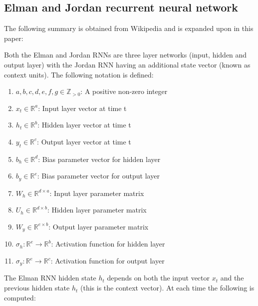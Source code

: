 \documentclass[conference]{IEEEtran}
\begin{document}
\subsection{Elman and Jordan recurrent neural network}

The following summary is obtained from Wikipedia\cite{enwiki:1314348414} and is expanded upon in this paper:

Both the Elman and Jordan RNNs are three layer networks (input, hidden and output layer) with the Jordan RNN having an additional state vector (known as context units). The following notation is defined:

\begin{enumerate}
	\item $a,b,c,d,e,f,g \in \mathbb{Z}_{>0}$: A positive non-zero integer
	
	\item $x_t \in \mathbb{R}^a$: Input layer vector at time t
	\item $h_t \in \mathbb{R}^b$: Hidden layer vector at time t
	\item $y_t \in \mathbb{R}^c$: Output layer vector at time t
	
	\item $b_h \in \mathbb{R}^{d}$: Bias parameter vector for hidden layer
	\item $b_y \in \mathbb{R}^{e}$: Bias parameter vector for output layer
	
	\item $W_h \in \mathbb{R}^{d \times a}$: Input layer parameter matrix
	\item $U_h \in \mathbb{R}^{d \times b}$: Hidden layer parameter matrix
	
	\item $W_y \in \mathbb{R}^{e \times b}$: Output layer parameter matrix
	
	
	\item $\sigma_h: \mathbb{R}^e \to \mathbb{R}^b $: Activation function for hidden layer
	\item $\sigma_y: \mathbb{R}^e \to \mathbb{R}^c $: Activation function for output layer
\end{enumerate}



The Elman RNN hidden state $h_t$ depends on both the input vector $x_t$ and the previous hidden state $h_t$ (this is the context vector). At each time the following is computed:
\end{document}
